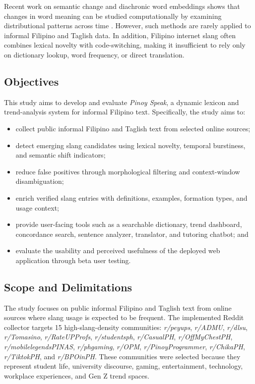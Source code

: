 Recent work on semantic change and diachronic word embeddings shows that changes in word meaning can be studied computationally by examining distributional patterns across time \cite{b7,b8,b9}. However, such methods are rarely applied to informal Filipino and Taglish data. In addition, Filipino internet slang often combines lexical novelty with code-switching, making it insufficient to rely only on dictionary lookup, word frequency, or direct translation.

\subsection{Objectives}
This study aims to develop and evaluate \textit{Pinoy Speak}, a dynamic lexicon and trend-analysis system for informal Filipino text. Specifically, the study aims to:

\begin{itemize}
    \item collect public informal Filipino and Taglish text from selected online sources;
    \item detect emerging slang candidates using lexical novelty, temporal burstiness, and semantic shift indicators;
    \item reduce false positives through morphological filtering and context-window disambiguation;
    \item enrich verified slang entries with definitions, examples, formation types, and usage context;
    \item provide user-facing tools such as a searchable dictionary, trend dashboard, concordance search, sentence analyzer, translator, and tutoring chatbot; and
    \item evaluate the usability and perceived usefulness of the deployed web application through beta user testing.
\end{itemize}

\subsection{Scope and Delimitations}
The study focuses on public informal Filipino and Taglish text from online sources where slang usage is expected to be frequent. The implemented Reddit collector targets 15 high-slang-density communities: \textit{r/peyups}, \textit{r/ADMU}, \textit{r/dlsu}, \textit{r/Tomasino}, \textit{r/RateUPProfs}, \textit{r/studentsph}, \textit{r/CasualPH}, \textit{r/OffMyChestPH}, \textit{r/mobilelegendsPINAS}, \textit{r/phgaming}, \textit{r/OPM}, \textit{r/PinoyProgrammer}, \textit{r/ChikaPH}, \textit{r/TiktokPH}, and \textit{r/BPOinPH}. These communities were selected because they represent student life, university discourse, gaming, entertainment, technology, workplace experiences, and Gen Z trend spaces.

